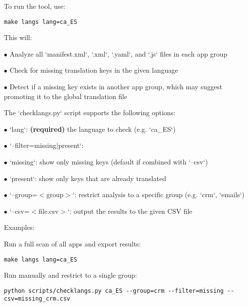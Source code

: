 \documentclass[a4paper]{article}
\begin{document}
To run the tool, use:

\begin{lstlisting}
make langs lang=ca_ES
\end{lstlisting}

This will:

\begin{compactitem}
\item[\color{myblue}$\bullet$] Analyze all `manifest.xml`, `.xml`, `.yaml`, and `.js` files in each app group
\item[\color{myblue}$\bullet$] Check for missing translation keys in the given language
\item[\color{myblue}$\bullet$] Detect if a missing key exists in another app group, which may suggest promoting it to the global translation file
\end{compactitem}

The `checklangs.py` script supports the following options:

\begin{compactitem}
\item[\color{myblue}$\bullet$] `lang`: \textbf{(required)} the language to check (e.g. `ca\_ES`)
\item[\color{myblue}$\bullet$] `--filter=missing$|$present`:
   \begin{compactitem}
   \item[\color{myblue}$\bullet$] `missing`: show only missing keys (default if combined with `--csv`)
   \item[\color{myblue}$\bullet$] `present`: show only keys that are already translated
   \end{compactitem}
\item[\color{myblue}$\bullet$] `--group=$<$group$>$`: restrict analysis to a specific group (e.g. `crm`, `emails`)
\item[\color{myblue}$\bullet$] `--csv=$<$file.csv$>$`: output the results to the given CSV file
\end{compactitem}

Examples:

Run a full scan of all apps and export results:

\begin{lstlisting}
make langs lang=ca_ES
\end{lstlisting}

Run manually and restrict to a single group:

\begin{lstlisting}
python scripts/checklangs.py ca_ES --group=crm --filter=missing --csv=missing_crm.csv
\end{lstlisting}
\end{document}
